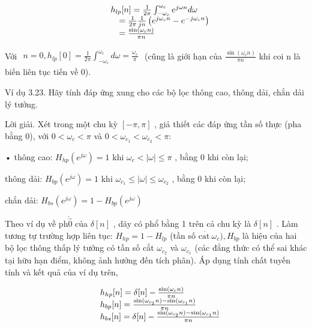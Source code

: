 \documentclass[
  10
]{article}
\begin{document}
\[
\begin{array}{r l} & h _ {l p} [ n ] = \frac {1}{2 \pi} \int_ {- \omega_ {c}} ^ {\omega_ {c}} e ^ {j \omega n} d \omega \\ & \quad = \frac {1}{2 \pi} \frac {1}{j n} \left(e ^ {j \omega_ {c} n} - e ^ {- j \omega_ {c} n}\right) \\ & \quad = \frac {\sin (\omega_ {c} n)}{\pi n} \end{array}
\]

Với
\(\begin{array} { r } { n = 0 , h _ { l p } [ 0 ] = \frac { 1 } { 2 \pi } \int _ { - \omega _ { c } } ^ { \omega _ { c } } d \omega = \frac { \omega _ { c } } { \pi } } \end{array}\)
(cũng là giới hạn của \(\frac { \sin ( \omega _ { c } n ) } { \pi n }\)
khi coi n là biến liên tục tiến về 0). 

Ví dụ 3.23. Hãy tính đáp ứng xung cho các bộ lọc thông cao, thông dải,
chắn dải lý tưởng.

Lời giải. Xét trong một chu kỳ \([ - \pi , \pi ]\) , giả thiết các đáp
ứng tần số thực (pha bằng 0), với \(0 < \omega _ { c } < \pi\) và
\(0 < \omega _ { c _ { 1 } } < \omega _ { c _ { 2 } } < \pi :\)

• thông cao: \(H _ { h p } ( e ^ { j \omega } ) = 1\) khi
\(\omega _ { c } < | \omega | \leq \pi\) , bằng 0 khi còn lại;

thông dải: \(H _ { b p } ( e ^ { j \omega } ) = 1\) khi
\(\omega _ { c _ { 1 } } \leq | \omega | \leq \omega _ { c _ { 2 } }\) ,
bằng 0 khi còn lại;

chắn dải:
\(H _ { b s } ( e ^ { j \omega } ) = 1 - H _ { b p } ( e ^ { j \omega } )\)

Theo ví dụ về \(\mathrm { p h } \mathring { \hat { 0 } }\) của
\(\delta [ n ]\) , dãy có phổ bằng 1 trên cả chu kỳ là \(\delta [ n ]\)
. Làm tương tự trường hợp liên tục: \(H _ { h p } = 1 - H _ { l p }\)
(tần số
\(\mathrm { c } \acute { \mathrm { a t } } \ \omega _ { c } ) , H _ { b p }\)
là hiệu của hai bộ lọc thông thấp lý tưởng có tần số cắt
\(\omega _ { c _ { 2 } }\) và \(\omega _ { c _ { 1 } }\) (các đẳng thức
có thể sai khác tại hữu hạn điểm, không ảnh hưởng đến tích phân). Áp
dụng tính chất tuyến tính và kết quả của ví dụ trên,

\[
\begin{array}{r l} & h _ {h p} [ n ] = \delta [ n ] - \frac {\sin (\omega_ {c} n)}{\pi n} \\ & h _ {b p} [ n ] = \frac {\sin (\omega_ {c _ {2}} n) - \sin (\omega_ {c _ {1}} n)}{\pi n} \\ & h _ {b s} [ n ] = \delta [ n ] - \frac {\sin (\omega_ {c _ {2}} n) - \sin (\omega_ {c _ {1}} n)}{\pi n} \end{array}
\]
\end{document}
